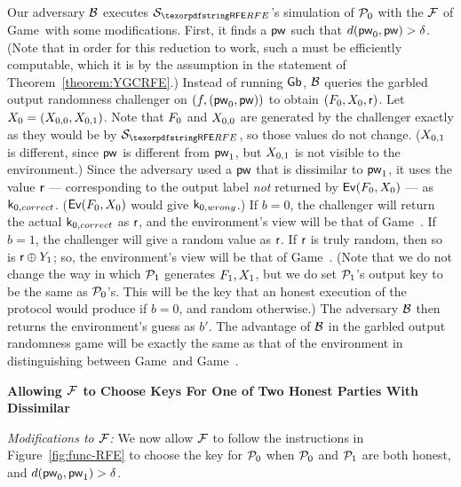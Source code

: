 \begin{games}
Our adversary $\mathcal{B}$ executes $\SimYGCRFE$'s simulation of $\mathcal{P}_{0}$ with the $\mathcal{F}$ of Game~\previousgame with some modifications.
First, it finds a \password $\mathsf{pw}$ such that $d(\mathsf{pw}_{0}, \mathsf{pw}) > \delta$.
(Note that in order for this reduction to work, such a \password must be efficiently computable, which it is by the assumption in the statement of Theorem~\ref{theorem:YGCRFE}.)
Instead of running $\mathsf{Gb}$, $\mathcal{B}$ queries the garbled output randomness challenger on $(f, (\mathsf{pw}_{0}, \mathsf{pw}))$ to obtain $(F_{0}, X_{0}, \mathsf{r})$.
Let $X_{0} = (X_{0, 0}, X_{0, 1})$.
Note that $F_{0}$ and $X_{0,0}$ are generated by the challenger exactly as they would be by $\SimYGCRFE$, so those values do not change. 
($X_{0,1}$ is different, since $\mathsf{pw}$ is different from $\mathsf{pw}_{1}$, but $X_{0,1}$ is not visible to the environment.)
Since the adversary used a \password $\mathsf{pw}$ that is dissimilar to $\mathsf{pw}_{1}$, it uses the value $\mathsf{r}$ --- corresponding to the output label \emph{not} returned by $\mathsf{Ev}(F_{0}, X_{0})$ --- as $\mathsf{k}_{0, correct}$.
($\mathsf{Ev}(F_{0}, X_{0})$ would give $\mathsf{k}_{0, wrong}$.) 
If $b = 0$, the challenger will return the actual $\mathsf{k}_{0, correct}$ as $\mathsf{r}$, and the environment's view will be that of Game~\previousgame.
If $b = 1$, the challenger will give a random value as $\mathsf{r}$.
If $\mathsf{r}$ is truly random, then so is $\mathsf{r} \oplus Y_{1}$; so, the environment's view will be that of Game~\thisgame.
(Note that we do not change the way in which $\mathcal{P}_{1}$ generates $F_{1}, X_{1}$, but we do set $\mathcal{P}_{1}$'s output key to be the same as $\mathcal{P}_{0}$'s. 
This will be the key that an honest execution of the protocol would produce if $b = 0$, and random otherwise.)
The adversary $\mathcal{B}$ then returns the environment's guess as $b'$.
The advantage of $\mathcal{B}$ in the garbled output randomness game will be exactly the same as that of the environment in distinguishing between Game~\previousgame and Game~\thisgame.

\textbf{Allowing $\mathcal{F}$ to Choose Keys For One of Two Honest Parties With Dissimilar \Passwords}

\textit{Modifications to $\mathcal{F}$:}
We now allow $\mathcal{F}$ to follow the instructions in Figure~\ref{fig:func-RFE} to choose the key for $\mathcal{P}_{0}$ when $\mathcal{P}_{0}$ and $\mathcal{P}_{1}$ are both honest, and $d(\mathsf{pw}_{0}, \mathsf{pw}_{1}) > \delta$.


\end{games}

